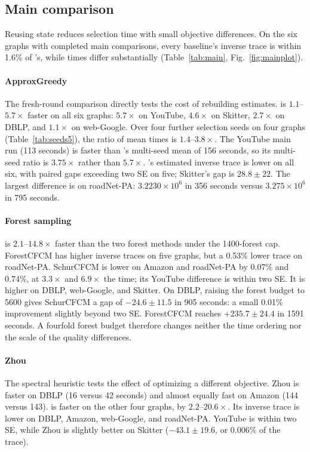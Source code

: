\subsection{Main comparison}\label{sec:maincmp}
Reusing state reduces selection time with small objective differences.
On the six graphs with completed main comparisons, every baseline's
inverse trace is within 1.6\% of \alg{}'s, while times differ
substantially (Table~\ref{tab:main}, Fig.~\ref{fig:mainplot}).

\paragraph{ApproxGreedy}
The fresh-round comparison directly tests the cost of rebuilding
estimates. \alg{} is $1.1$--$5.7\times$ faster on all six graphs:
$5.7\times$ on YouTube, $4.6\times$ on Skitter, $2.7\times$ on
DBLP, and $1.1\times$ on web-Google. Over four further selection
seeds on four graphs (Table~\ref{tab:seeds5}), the ratio of mean times
is $1.4$--$3.8\times$. The YouTube main run (113 seconds) is faster
than \alg{}'s multi-seed mean of 156 seconds, so its multi-seed ratio
is $3.75\times$ rather than $5.7\times$. \alg{}'s estimated inverse trace
is lower on all six, with paired gaps exceeding two SE on five;
Skitter's gap is $28.8\pm22$. The largest difference is on
roadNet-PA: $3.2230\times10^6$ in 356 seconds versus
$3.275\times10^6$ in 795 seconds.

\paragraph{Forest sampling}
\alg{} is $2.1$--$14.8\times$ faster than the two forest methods
under the 1400-forest cap. ForestCFCM has higher inverse traces on
five graphs, but a 0.53\% lower trace on roadNet-PA. SchurCFCM
is lower on Amazon and roadNet-PA by 0.07\% and 0.74\%, at
$3.3\times$ and $6.9\times$ the time; its YouTube difference is
within two SE. It is higher on DBLP, web-Google, and Skitter.
On DBLP, raising the forest budget to 5600 gives SchurCFCM a gap
of $-24.6\pm11.5$ in 905 seconds: a small 0.01\% improvement
slightly beyond two SE. ForestCFCM reaches $+235.7\pm24.4$ in
1591 seconds. A fourfold forest budget therefore changes neither the
time ordering nor the scale of the quality differences.

\paragraph{Zhou}
The spectral heuristic tests the effect of optimizing a different
objective. Zhou is faster on DBLP (16 versus 42 seconds) and almost
equally fast on Amazon (144 versus 143). \alg{} is faster on the
other four graphs, by $2.2$--$20.6\times$. Its inverse trace is
lower on DBLP, Amazon, web-Google, and roadNet-PA. YouTube is
within two SE, while Zhou is slightly better on Skitter
($-43.1\pm19.6$, or 0.006\% of the trace).

